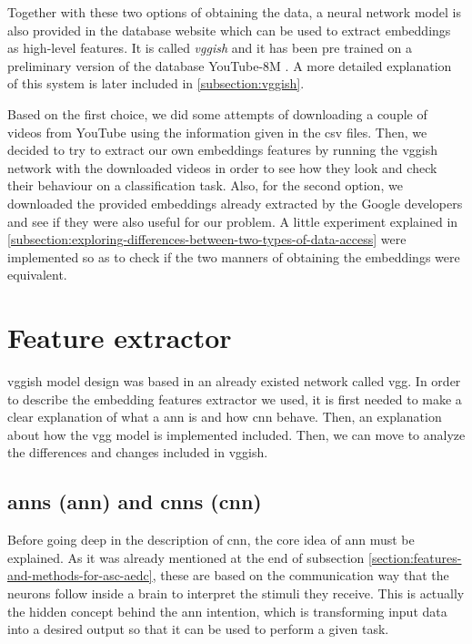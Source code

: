 	Together with these two options of obtaining the data, a neural network model is also provided in the database website which can be used to extract embeddings as high-level features. It is called \textit{\acrshort{vgg}ish} \cite{Hershey2017} and it has been pre trained on a preliminary version of the database YouTube-8M \cite{Abu-El-Haija2016}. A more detailed explanation of this system is later included in \ref{subsection:vggish}.
	
	Based on the first choice, we did some attempts of downloading a couple of videos from YouTube using the information given in the \acrshort{csv} files. Then, we decided to try to extract our own embeddings features by running the \acrshort{vgg}ish network with the downloaded videos in order to see how they look and check their behaviour on a classification task. Also, for the second option, we downloaded the provided embeddings already extracted by the Google developers and see if they were also useful for our problem. A little experiment explained in \ref{subsection:exploring-differences-between-two-types-of-data-access} were implemented so as to check if the two manners of obtaining the embeddings were equivalent.

\section{Feature extractor}
\label{section:feature-extractor}

	\acrshort{vgg}ish model design was based in an already existed network called \acrshort{vgg}. In order to describe the embedding features extractor we used, it is first needed to make a clear explanation of what a \acrlong{ann} is and how \acrlong{cnn} behave. Then, an explanation about how the \acrshort{vgg} model is implemented included. Then, we can move to analyze the differences and changes included in \acrshort{vgg}ish. 

\subsection{\acrlong{ann}s (\acrshort{ann}) and \acrlong{cnn}s (\acrshort{cnn})}
\label{subsection:ann-cnn}

	Before going deep in the description of \acrshort{cnn}, the core idea of \acrshort{ann} must be explained. As it was already mentioned at the end of subsection \ref{section:features-and-methods-for-asc-aedc}, these are based on the communication way that the neurons follow inside a brain to interpret the stimuli they receive. This is actually the hidden concept behind the \acrshort{ann} intention, which is transforming input data into a desired output so that it can be used to perform a given task. %

